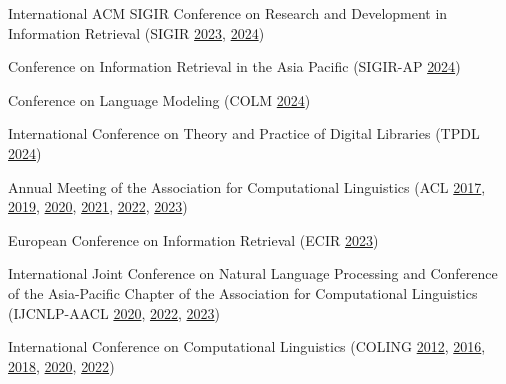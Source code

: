 \begin{itemize*}[label={},
                 itemjoin={{,\space}},
                 afterlabel={},
                 after={{.}}]

    \item International ACM SIGIR Conference on Research and Development in Information Retrieval
    (SIGIR
    \href{https://dl.acm.org/action/showFmPdf?doi=10.1145%2F3539618}{2023},
    \href{https://dl.acm.org/action/showFmPdf?doi=10.1145%2F3626772}{2024})

    \item Conference on Information Retrieval in the Asia Pacific
    (SIGIR-AP
    \href{https://dl.acm.org/action/showFmPdf?doi=10.1145%2F3673791}{2024})

    \item Conference on Language Modeling
    (COLM
    \href{https://2024.colmweb.org/}{2024})

    \item International Conference on Theory and Practice of Digital Libraries
    (TPDL
    \href{https://link.springer.com/book/10.1007/978-3-031-72437-4}{2024})

    \item Annual Meeting of the Association for Computational Linguistics
    (ACL
    \href{https://aclanthology.org/P17-1000.pdf}{2017},
    \href{https://aclanthology.org/P19-1000.pdf}{2019},
    \href{https://aclanthology.org/2020.acl-main.0.pdf}{2020},
    \href{https://aclanthology.org/2021.acl-long.0.pdf}{2021},
    \href{https://aclanthology.org/2022.acl-long.0.pdf}{2022},
    \href{https://aclanthology.org/2023.acl-long.0.pdf}{2023})

    \item European Conference on Information Retrieval
    (ECIR \href{https://link.springer.com/content/pdf/bfm:978-3-031-28244-7/1}{2023})

    \item 
    International Joint Conference on Natural Language Processing and Conference of the Asia-Pacific Chapter of the Association for Computational Linguistics (IJCNLP-AACL
    \href{https://aclanthology.org/2020.aacl-main.pdf}{2020},
    \href{https://aclanthology.org/2022.aacl-main.0.pdf}{2022},
    \href{https://aclanthology.org/2023.ijcnlp-main.0.pdf}{2023})

    \item International Conference on Computational Linguistics
    (COLING
    \href{https://aclanthology.org/C12-1000.pdf}{2012},
    \href{https://aclanthology.org/C16-1000.pdf}{2016},
    \href{https://aclanthology.org/C18-1000.pdf}{2018},
    \href{https://aclanthology.org/2020.coling-main.0.pdf}{2020},
    \href{https://aclanthology.org/2022.coling-1.0.pdf}{2022})


\end{itemize*}
